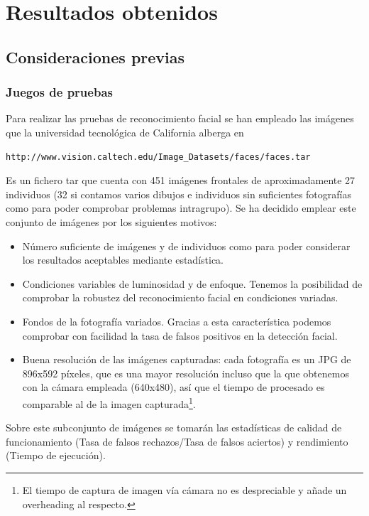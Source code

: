 \chapter{Resultados obtenidos}

\section{Consideraciones previas}

\subsection{Juegos de pruebas}
Para realizar las pruebas de reconocimiento facial se han empleado las imágenes que la universidad tecnológica de California alberga en 
\begin{verbatim}
http://www.vision.caltech.edu/Image_Datasets/faces/faces.tar 
\end{verbatim}
Es un fichero tar que cuenta con 451 imágenes frontales de aproximadamente 27 individuos (32 si contamos varios dibujos e individuos sin suficientes fotografías como para poder comprobar problemas intragrupo). Se ha decidido emplear este conjunto de imágenes por los siguientes motivos:
\begin{itemize}
	\item{Número suficiente de imágenes y de individuos como para poder considerar los resultados aceptables mediante estadística.}
	\item{Condiciones variables de luminosidad y de enfoque. Tenemos la posibilidad de comprobar la robustez del reconocimiento facial en condiciones variadas.}
	\item{Fondos de la fotografía variados. Gracias a esta característica podemos comprobar con facilidad la tasa de falsos positivos en la detección facial.}
	\item{Buena resolución de las imágenes capturadas: cada fotografía es un JPG de 896x592 píxeles, que es una mayor resolución incluso que la que obtenemos con la cámara empleada (640x480), así que el tiempo de procesado es comparable al de la imagen capturada\footnote{El tiempo de captura de imagen vía cámara no es despreciable y añade un overheading al respecto.}. }
\end{itemize}

Sobre este subconjunto de imágenes se tomarán las estadísticas de calidad de funcionamiento (Tasa de falsos rechazos/Tasa de falsos aciertos) y rendimiento (Tiempo de ejecución).

